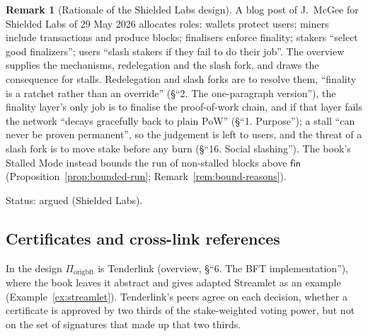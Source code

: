 \documentclass[11pt,a4paper]{article}
\theoremstyle{definition}
\newtheorem{remark}[theorem]{Remark}
\newcommand{\Piorigbft}{\Pi_{\mathrm{origbft}}}
\newcommand{\fin}{\mathsf{fin}}
\begin{document}
\begin{remark}[Rationale of the Shielded Labs design]\label{rem:sl-rationale}
A blog post of J.~McGee for Shielded Labs of 29 May 2026 allocates roles:
wallets protect users; miners include transactions and produce blocks;
finalisers enforce finality; stakers ``select good finalizers''; users
``slash stakers if they fail to do their job''. The overview supplies the
mechanisms, redelegation and the slash fork, and draws the consequence for
stalls. Redelegation and slash forks are to resolve them,
``finality is a ratchet rather than an override'' (\S``2. The one-paragraph
version''), the finality layer's only job is to finalise the proof-of-work
chain, and if that layer fails the network ``decays gracefully back to plain
PoW'' (\S``1. Purpose''); a stall ``can never be proven permanent'', so the
judgement is left to users, and the threat of a slash fork is to move stake
before any burn (\S``16. Social slashing''). The book's Stalled Mode instead
bounds the run of non-stalled blocks above $\fin$
(Proposition~\ref{prop:bounded-run}; Remark~\ref{rem:bound-reasons}).

Status: argued (Shielded Labs).
\end{remark}

\subsection{Certificates and cross-link references}\label{sec:sl-certs}

In the design $\Piorigbft$ is Tenderlink (overview, \S``6. The BFT
implementation''), where the book leaves it abstract and gives adapted
Streamlet as an example (Example~\ref{ex:streamlet}). Tenderlink's peers
agree on each decision, whether a certificate is approved by two thirds of
the stake-weighted voting power, but not on the set of signatures that
made up that two thirds.
\end{document}
